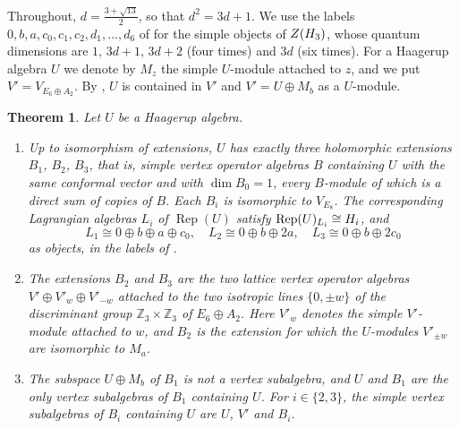 \documentclass[leqno]{article}
\let\cal\relax
\newcommand{\cal}{\mathcal}
\newcommand{\Z}{\ensuremath{\mathbb{Z}}}
\DeclareMathOperator{\Rep}{Rep} %
\newtheorem{thm}{Theorem}[section]
\numberwithin{equation}{section}
\begin{document}
Throughout, $d = \frac{3+\sqrt{13}}{2}$, so that $d^2 = 3d+1$. We use the labels $0, b, a, c_0, c_1, c_2, d_1, \ldots, d_6$ of \cite{EvG11} for the simple objects of $Z(\cal H_3)$, whose quantum dimensions are $1$, $3d+1$, $3d+2$ (four times) and $3d$ (six times). For a Haagerup algebra $U$ we denote by $M_z$ the simple $U$-module attached to $z$, and we put $V' = V_{E_6 \oplus A_2}$. By \cite[Proposition 4.1]{Arh26}, $U$ is contained in $V'$ and $V' = U \oplus M_b$ as a $U$-module.

\begin{thm}
\label{thm:intro-A}
Let $U$ be a Haagerup algebra.
\begin{enumerate}
\item Up to isomorphism of extensions, $U$ has exactly three holomorphic extensions $B_1$, $B_2$, $B_3$, that is, simple vertex operator algebras $B$ containing $U$ with the same conformal vector and with $\dim B_0 = 1$, every $B$-module of which is a direct sum of copies of $B$. Each $B_i$ is isomorphic to $V_{E_8}$. The corresponding Lagrangian algebras $L_i$ of $\Rep(U)$ satisfy $\Rep(U)_{L_i} \cong \cal H_i$, and
\[
L_1 \cong 0 \oplus b \oplus a \oplus c_0,\quad L_2 \cong 0 \oplus b \oplus 2a,\quad L_3 \cong 0 \oplus b \oplus 2c_0
\]
as objects, in the labels of \cite{EvG11}.
\item The extensions $B_2$ and $B_3$ are the two lattice vertex operator algebras $V' \oplus V'_{w} \oplus V'_{-w}$ attached to the two isotropic lines $\{0,\pm w\}$ of the discriminant group $\Z_3 \times \Z_3$ of $E_6 \oplus A_2$. Here $V'_w$ denotes the simple $V'$-module attached to $w$, and $B_2$ is the extension for which the $U$-modules $V'_{\pm w}$ are isomorphic to $M_a$.
\item The subspace $U \oplus M_b$ of $B_1$ is not a vertex subalgebra, and $U$ and $B_1$ are the only vertex subalgebras of $B_1$ containing $U$. For $i \in \{2,3\}$, the simple vertex subalgebras of $B_i$ containing $U$ are $U$, $V'$ and $B_i$.
\end{enumerate}
\end{thm}
\end{document}
